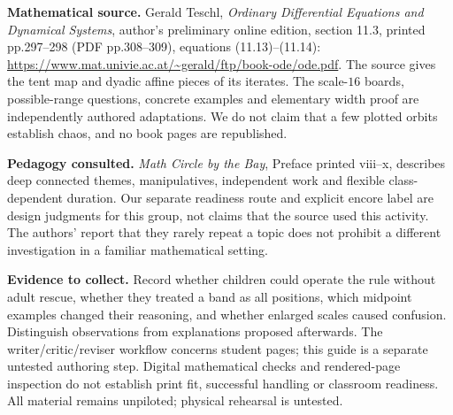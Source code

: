\documentclass[11pt,letterpaper]{article}
\begin{document}
\textbf{Mathematical source.} Gerald Teschl, \emph{Ordinary Differential Equations and Dynamical Systems}, author's preliminary online edition, section 11.3, printed pp.297--298 (PDF pp.308--309), equations (11.13)--(11.14):
\url{https://www.mat.univie.ac.at/~gerald/ftp/book-ode/ode.pdf}.
The source gives the tent map and dyadic affine pieces of its iterates. The scale-$16$ boards, possible-range questions, concrete examples and elementary width proof are independently authored adaptations. We do not claim that a few plotted orbits establish chaos, and no book pages are republished.

\textbf{Pedagogy consulted.} \emph{Math Circle by the Bay}, Preface printed viii--x, describes deep connected themes, manipulatives, independent work and flexible class-dependent duration. Our separate readiness route and explicit encore label are design judgments for this group, not claims that the source used this activity. The authors' report that they rarely repeat a topic does not prohibit a different investigation in a familiar mathematical setting.

\textbf{Evidence to collect.} Record whether children could operate the rule without adult rescue, whether they treated a band as all positions, which midpoint examples changed their reasoning, and whether enlarged scales caused confusion. Distinguish observations from explanations proposed afterwards. The writer/critic/reviser workflow concerns student pages; this guide is a separate untested authoring step. Digital mathematical checks and rendered-page inspection do not establish print fit, successful handling or classroom readiness. All material remains unpiloted; physical rehearsal is untested.
\end{document}

